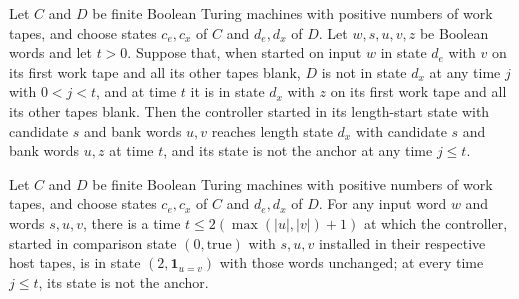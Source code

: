 \begin{lemma}
\label{Turing.FinTM.emitterP2_body_length}
\leanok
{}
Let $C$ and $D$ be finite Boolean Turing machines with positive numbers of work tapes,
and choose states $c_e,c_x$ of $C$ and $d_e,d_x$ of $D$. Let $w,s,u,v,z$ be Boolean
words and let $t>0$. Suppose that, when started on input $w$ in state $d_e$ with $v$ on
its first work tape and all its other tapes blank, $D$ is not in state $d_x$ at any time
$j$ with $0<j<t$, and at time $t$ it is in state $d_x$ with $z$ on its first work tape
and all its other tapes blank. Then the controller started in its length-start state
with candidate $s$ and bank words $u,v$ reaches length state $d_x$ with candidate $s$
and bank words $u,z$ at time $t$, and its state is not the anchor at any time $j\le t$.
\end{lemma}

\begin{lemma}
\label{Turing.FinTM.emitterP2_body_compare}
\leanok
{}
Let $C$ and $D$ be finite Boolean Turing machines with positive numbers of work tapes,
and choose states $c_e,c_x$ of $C$ and $d_e,d_x$ of $D$. For any input word $w$ and
words $s,u,v$, there is a time $t\le 2(\max(|u|,|v|)+1)$ at which the controller,
started in comparison state $(0,\mathrm{true})$ with $s,u,v$ installed in their
respective host tapes, is in state $(2,\mathbf{1}_{u=v})$ with those words unchanged; at
every time $j\le t$, its state is not the anchor.
\end{lemma}

